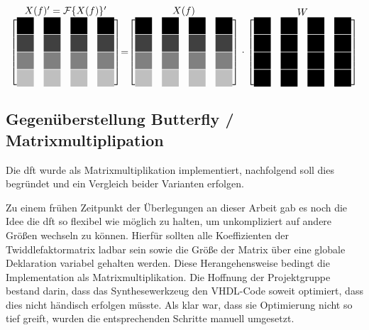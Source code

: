  \[
  \stackrel{\mbox{$X(f)' = \mathcal{F}\{X(f)\}'$}}{
   \begin{bmatrix}
    \myBlackBox 	& \myBlackBox 		& \myBlackBox 		& \myBlackBox \\
    \myDarkgrayBox 	& \myDarkgrayBox 	& \myDarkgrayBox 	& \myDarkgrayBox \\
    \myGrayBox 		& \myGrayBox 		& \myGrayBox 		& \myGrayBox \\
    \myLightgrayBox 	& \myLightgrayBox 	& \myLightgrayBox 	& \myLightgrayBox 
   \end{bmatrix}
  }
  =
  \stackrel{\mbox{$X(f)$}}{
   \begin{bmatrix}
    \myBlackBox 	& \myBlackBox 		& \myBlackBox 		& \myBlackBox \\
    \myDarkgrayBox 	& \myDarkgrayBox 	& \myDarkgrayBox 	& \myDarkgrayBox \\
    \myGrayBox 		& \myGrayBox 		& \myGrayBox 		& \myGrayBox \\
    \myLightgrayBox 	& \myLightgrayBox 	& \myLightgrayBox 	& \myLightgrayBox 
   \end{bmatrix}
  }
  \cdot
  \stackrel{\mbox{$W$}}{
   \begin{bmatrix}
    \myBlackBox & \myBlackBox & \myBlackBox & \myBlackBox \\
    \myBlackBox & \myBlackBox & \myBlackBox & \myBlackBox \\
    \myBlackBox & \myBlackBox & \myBlackBox & \myBlackBox \\
    \myBlackBox & \myBlackBox & \myBlackBox & \myBlackBox 
   \end{bmatrix}
  }
 \]
 

  \subsection{Gegenüberstellung Butterfly / Matrixmultiplipation} 
  Die \gls{dft} wurde als Matrixmultiplikation implementiert, nachfolgend soll dies begründet und ein Vergleich beider Varianten erfolgen.
  
  Zu einem frühen Zeitpunkt der Überlegungen 
  an dieser Arbeit gab es noch die Idee die \gls{dft} so flexibel wie möglich zu halten, um unkompliziert auf andere Größen wechseln zu können.
  Hierfür sollten alle Koeffizienten der Twiddlefaktormatrix ladbar sein sowie die Größe der Matrix über eine globale Deklaration variabel gehalten werden.
  Diese Herangehensweise bedingt die Implementation als Matrixmultiplikation. Die Hoffnung der Projektgruppe bestand darin, dass das Synthesewerkzeug den 
  VHDL-Code soweit optimiert, dass dies nicht händisch erfolgen müsste.
  Als klar war, dass sie Optimierung nicht so tief greift, wurden die entsprechenden Schritte manuell umgesetzt. 
  
